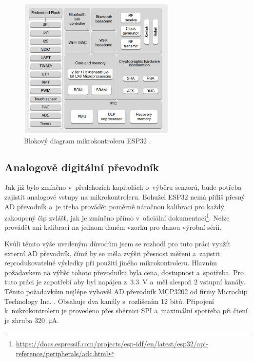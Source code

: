 \begin{figure}
    \centering
    \includegraphics[width=0.7\textwidth]{obrazky/esp32_internalStructure.png}
    \caption[Blokový diagram mikrokontroleru ESP32.]{Blokový diagram mikrokontroleru ESP32 \cite{dat_ESP32-WROOM}.}
    \label{fig_ESP32InternalStructure}
\end{figure}

\subsection{Analogově digitální převodník}

Jak již bylo zmíněno v~předchozích kapitolách o~výběru senzorů, bude potřeba zajistit analogové vstupy na mikrokontroleru. Bohužel ESP32 nemá příliš přesný AD převodník a~je třeba provádět poměrně náročnou kalibraci pro každý zakoupený čip zvlášť, jak je zmíněno přímo v~oficiální dokumentaci\footnote{\url{https://docs.espressif.com/projects/esp-idf/en/latest/esp32/api-reference/peripherals/adc.html}}. Nelze provádět ani kalibraci na jednom daném vzorku pro danou výrobní sérii.

Kvůli těmto výše uvedeným důvodům jsem se rozhodl pro tuto práci využít externí AD převodník, čímž by se měla zvýšit přesnost měření a~zajistit reprodukovatelné výsledky při použití jiného mikrokontroleru. Hlavním požadavkem na výběr tohoto převodníku byla cena, dostupnost a~spotřeba. Pro tuto práci je zapotřebí aby byl napájen z~\SI{3,3}{\volt} a~měl alespoň 2 vstupní kanály. Těmto požadavkům nejlépe vyhověl AD převodník MCP3202 od firmy Microchip Technology Inc. \cite{dat_MCP3202}. Obsahuje dva kanály s~rozlišením 12 bitů. Připojení k~mikrokontroleru je provedeno přes sběrnici SPI a~maximální spotřeba při čtení je zhruba \SI{320}{\micro\ampere}.

